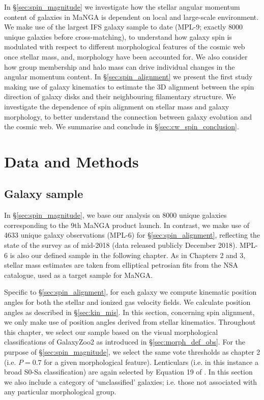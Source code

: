 In \S\ref{sec:spin_magnitude} we investigate how the stellar angular momentum content of galaxies in MaNGA is dependent on local and large-scale environment. We make use of the largest IFS galaxy sample to date (MPL-9; exactly 8000 unique galaxies before cross-matching), to understand how galaxy spin is modulated with respect to different morphological features of the cosmic web once stellar mass, and, morphology have been accounted for. We also consider how group membership and halo mass can drive individual changes in the angular momentum content. In \S\ref{sec:spin_alignment} we present the first study making use of galaxy kinematics to estimate the 3D alignment between the spin direction of galaxy disks and their neighbouring filamentary structure. We investigate the dependence of spin alignment on stellar mass and galaxy morphology, to better understand the connection between galaxy evolution and the cosmic web. We summarise and conclude in \S\ref{sec:cw_spin_conclusion}.

\section{Data and Methods}
\subsection{Galaxy sample} \label{sec:spin_galaxy_sample}
In \S\ref{sec:spin_magnitude}, we base our analysis on 8000 unique galaxies corresponding to the 9th MaNGA product launch. In contrast, we make use of 4633 unique galaxy observations (MPL-6) for \S\ref{sec:spin_alignment}, reflecting the state of the survey as of mid-2018 (data released publicly December 2018). MPL-6 is also our defined sample in the following chapter. As in Chapters 2 and 3, stellar mass estimates are taken from elliptical petrosian fits from the NSA catalogue, used as a target sample for MaNGA. 

Specific to \S\ref{sec:spin_alignment}, for each galaxy we compute kinematic position angles for both the stellar and ionized gas velocity fields. We calculate position angles as described in \S\ref{sec:kin_mis}. In this section, concerning spin alignment, we only make use of position angles derived from stellar kinematics.
Throughout this chapter, we select our sample based on the visual morphological classifications of GalaxyZoo2 \citep[GZ2][]{willett2013} as introduced in \S\ref{sec:morph_def_obs}. For the purpose of \S\ref{sec:spin_magnitude}, we select the same vote thresholds as chapter 2 (i.e. $P = 0.7$ for a given morphological feature). Lenticulars (i.e. in this instance a broad S0-Sa classification) are again selected by Equation 19 of \citet{willett2013}. In this section we also include a category of `unclassified' galaxies; i.e. those not associated with any particular morphological group.


